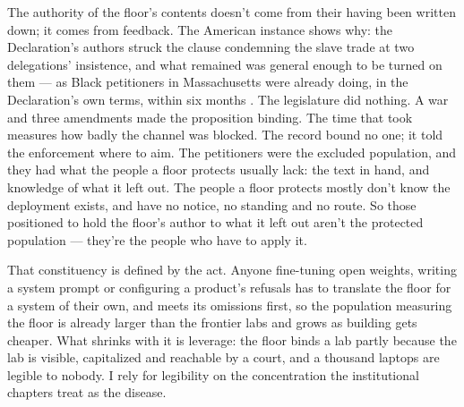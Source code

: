 
The authority of the floor's contents doesn't come from their having been written down; it comes from feedback. The American instance shows why: the Declaration's authors struck the clause condemning the slave trade at two delegations' insistence, and what remained was general enough to be turned on them — as Black petitioners in Massachusetts were already doing, in the Declaration's own terms, within six months \autocite{loc2010declaration,hall1777petition}. The legislature did nothing. A war and three amendments made the proposition binding. The time that took measures how badly the channel was blocked. The record bound no one; it told the enforcement where to aim. The petitioners were the excluded population, and they had what the people a floor protects usually lack: the text in hand, and knowledge of what it left out. The people a floor protects mostly don't know the deployment exists, and have no notice, no standing and no route. So those positioned to hold the floor's author to what it left out aren't the protected population — they're the people who have to apply it.

That constituency is defined by the act. Anyone fine-tuning open weights, writing a system prompt or configuring a product's refusals has to translate the floor for a system of their own, and meets its omissions first, so the population measuring the floor is already larger than the frontier labs and grows as building gets cheaper. What shrinks with it is leverage: the floor binds a lab partly because the lab is visible, capitalized and reachable by a court, and a thousand laptops are legible to nobody. I rely for legibility on the concentration the institutional chapters treat as the disease.
